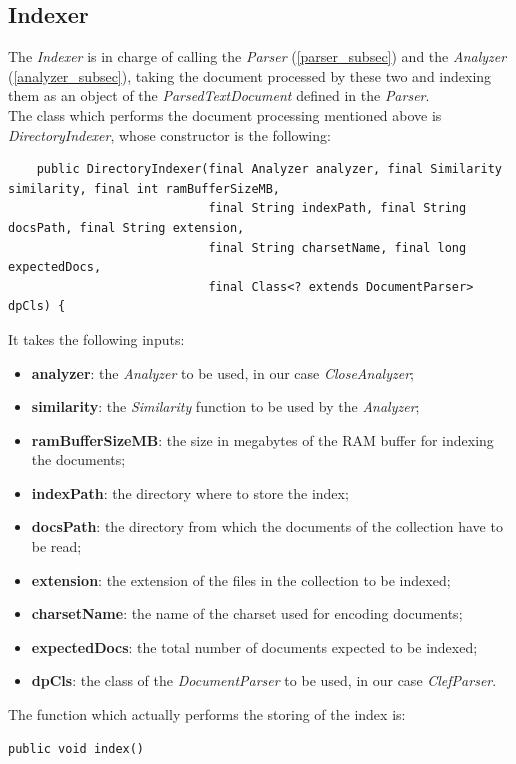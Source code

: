 \subsection{Indexer}
The \textit{Indexer} is in charge of calling the \textit{Parser} (\ref{parser_subsec}) and the \textit{Analyzer} (\ref{analyzer_subsec}), taking the document processed by these two and indexing them as an object of the \textit{ParsedTextDocument} defined in the \textit{Parser}. \\
The class which performs the document processing mentioned above is \textit{DirectoryIndexer}, whose constructor is the following:
\begin{lstlisting}
    public DirectoryIndexer(final Analyzer analyzer, final Similarity similarity, final int ramBufferSizeMB,
                            final String indexPath, final String docsPath, final String extension,
                            final String charsetName, final long expectedDocs,
                            final Class<? extends DocumentParser> dpCls) {
\end{lstlisting}
It takes the following inputs:
\begin{itemize}
\item \textbf{analyzer}: the \textit{Analyzer} to be used, in our case \textit{CloseAnalyzer};
\item \textbf{similarity}: the \textit{Similarity} function to be used by the \textit{Analyzer};
\item \textbf{ramBufferSizeMB}: the size in megabytes of the RAM buffer for indexing the documents;
\item \textbf{indexPath}: the directory where to store the index;
\item \textbf{docsPath}: the directory from which the documents of the collection have to be read;
\item \textbf{extension}: the extension of the files in the collection to be indexed;
\item \textbf{charsetName}: the name of the charset used for encoding documents;
\item \textbf{expectedDocs}: the total number of documents expected to be indexed;
\item \textbf{dpCls}: the class of the \textit{DocumentParser} to be used, in our case \textit{ClefParser}.
\end{itemize}
The function which actually performs the storing of the index is:
\begin{verbatim}
public void index()
\end{verbatim}
